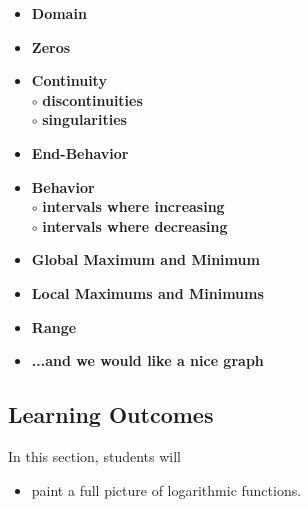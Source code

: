 \documentclass{ximera}
\begin{document}
\begin{itemize}
     \item \textbf{\textcolor{red!70!black}{Domain}} 
     \item \textbf{\textcolor{red!70!black}{Zeros}} 
     \item \textbf{\textcolor{red!70!black}{Continuity}} \\
     \text{    }$\circ$ \textbf{\textcolor{purple!85!blue}{discontinuities}}\\
     \text{    }$\circ$ \textbf{\textcolor{purple!85!blue}{singularities}}\\
     \item \textbf{\textcolor{red!70!black}{End-Behavior}} 
     \item \textbf{\textcolor{red!70!black}{Behavior}} \\
     \text{    }$\circ$ \textbf{\textcolor{purple!85!blue}{intervals where increasing}}\\
     \text{    }$\circ$ \textbf{\textcolor{purple!85!blue}{intervals where decreasing}}\\
     \item \textbf{\textcolor{red!70!black}{Global Maximum and Minimum}} 
     \item \textbf{\textcolor{red!70!black}{Local Maximums and Minimums}} 
     \item \textbf{\textcolor{red!70!black}{Range}} 
     \item \textbf{\textcolor{blue!55!black}{...and we would like a nice graph}} 
\end{itemize}




\subsection*{Learning Outcomes}


\begin{sectionOutcomes}
In this section, students will 

\begin{itemize}
\item paint a full picture of logarithmic functions.
\end{itemize}
\end{sectionOutcomes}
\end{document}
